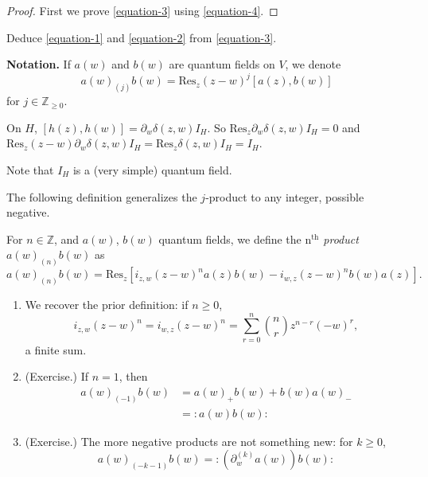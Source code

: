\begin{proof}
First we prove \ref{equation-3} using
\ref{equation-4}.
\end{proof}

\begin{exercise}
\label{exercise-deduce-1-and-2-from-3}
Deduce \ref{equation-1} and  \ref{equation-2}
from \ref{equation-3}.
\end{exercise}

\medskip\noindent
{\bf Notation.} If $a(w)$ and $b(w)$ are
quantum fields on $V$,
we denote
$$
a(w)_{(j)}b(w)=\text{Res}_z(z-w)^j[a(z),b(w)]
$$
for $j \in \mathbb{Z}_{\geq 0}$.

\begin{example}
\label{example-duplicate-2}
On $H$,
$[h(z),h(w)]=\partial_w\delta(z,w)I_H$.
So $\text{Res}_z\partial_w\delta(z,w)I_H=0$
and
$\text{Res}_z(z-w)\partial_w\delta(z,w)I_H=
\text{Res}_z\delta(z,w)I_H=I_H$.
\end{example}

Note that $I_H$ is a (very simple) quantum
field.

The following definition generalizes the
$j$-product to any
integer, possible negative.

\begin{definition}
\label{definition-nth-product}
For $n \in \mathbb{Z}$, and $a(w)$, $b(w)$
quantum fields,
we define the {\it $\text{n}^{\text{th}}$
product} $a(w)_{(n)}b(w)$ as
$$
a(w)_{(n)}b(w)=\text{Res}_z
[i_{z,w}(z-w)^na(z)b(w)-i_{w,z}(z-w)^nb(w)
a(z)].
$$
\end{definition}

\begin{remark}
\label{remark-nth-product}
\begin{enumerate}
\item We recover the prior definition: if $n
\geq 0$,
$$
i_{z,w}(z-w)^n=i_{w,z}(z-w)^n=\sum_{r=0}
^n\binom{n}{r}z^{n-r}(-w)^r,
$$
a finite sum.
\item (Exercise.) If $n=1$, then
$$
\begin{aligned}
a(w)_{(-1)}b(w)&=a(w)_+b(w)+b(w)a(w)_-\\
&=:\! a(w)b(w)\!:
\end{aligned}
$$

\item (Exercise.)
The more negative products are not something
new:
for $k \geq 0$,
$$
a(w)_{(-k-1)}b(w)=:\!(\partial_w^{(k)}a(w))
b(w)\!:
$$
\end{enumerate}
\end{remark}

